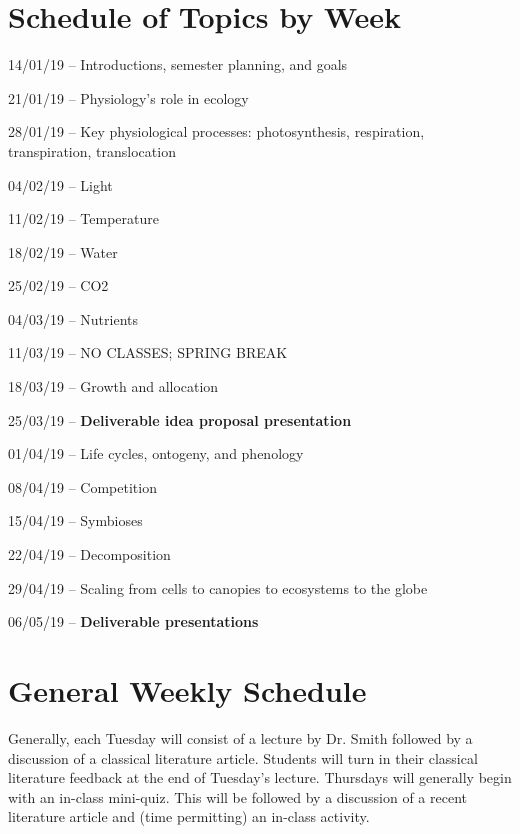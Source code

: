 \documentclass[12pt, notitlepage]{article}   	%
\begin{document}
\newpage

\section*{Schedule of Topics by Week}
14/01/19 – Introductions, semester planning, and goals \par
21/01/19 – Physiology’s role in ecology \par
28/01/19 – Key physiological processes: 
photosynthesis, respiration, transpiration, translocation \par
04/02/19 – Light \par
11/02/19 – Temperature \par
18/02/19 – Water \par
25/02/19 – CO2 \par
04/03/19 – Nutrients \par
11/03/19 – NO CLASSES; SPRING BREAK \par
18/03/19 – Growth and allocation \par
25/03/19 – \textbf{Deliverable idea proposal presentation} \par
01/04/19 – Life cycles, ontogeny, and phenology \par
08/04/19 – Competition \par
15/04/19 – Symbioses \par
22/04/19 – Decomposition \par
29/04/19 – Scaling from cells to canopies to ecosystems to the globe \par
06/05/19 – \textbf{Deliverable presentations} \par

\section*{General Weekly Schedule}
Generally, each Tuesday will consist of a lecture by Dr. Smith followed by a discussion
of a classical literature article. Students will turn in their classical literature
feedback at the end of Tuesday's lecture. Thursdays will generally begin with an in-class
mini-quiz. This will be followed by a discussion of a recent literature article and
(time permitting) an in-class activity.
\end{document}
